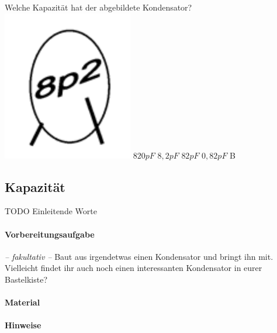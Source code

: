 {Welche Kapazität hat der abgebildete Kondensator?\\
\includegraphics[scale=0.9]{TC205.png}
}%
{$820pF$}%
{$8,2pF$}%
{$82pF$}%
{$0,82pF$}%
{B}%


\clearpage

\subsection{Kapazität}

TODO Einleitende Worte


\paragraph{Vorbereitungsaufgabe}

\emph{-- fakultativ --} Baut aus irgendetwas einen Kondensator und bringt ihn mit.
Vielleicht findet ihr auch noch einen interessanten Kondensator in eurer
Bastelkiste?

\paragraph{Material}


\paragraph{Hinweise}

